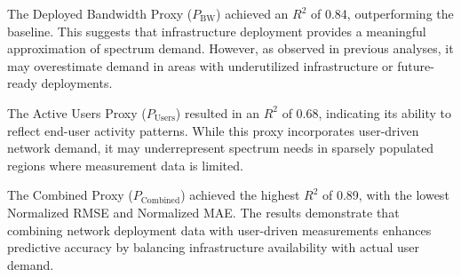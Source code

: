 \documentclass[conference]{IEEEtran}
\begin{document}

  
The Deployed Bandwidth Proxy (\( P_{\text{BW}} \)) achieved an \( R^2 \) of 0.84, outperforming the baseline. This suggests that infrastructure deployment provides a meaningful approximation of spectrum demand. However, as observed in previous analyses, it may overestimate demand in areas with underutilized infrastructure or future-ready deployments.

The Active Users Proxy (\( P_{\text{Users}} \)) resulted in an \( R^2 \) of 0.68, indicating its ability to reflect end-user activity patterns. While this proxy incorporates user-driven network demand, it may underrepresent spectrum needs in sparsely populated regions where measurement data is limited.

The Combined Proxy (\( P_{\text{Combined}} \)) achieved the highest \( R^2 \) of 0.89, with the lowest Normalized RMSE and Normalized MAE. The results demonstrate that combining network deployment data with user-driven measurements enhances predictive accuracy by balancing infrastructure availability with actual user demand.


\end{document}
